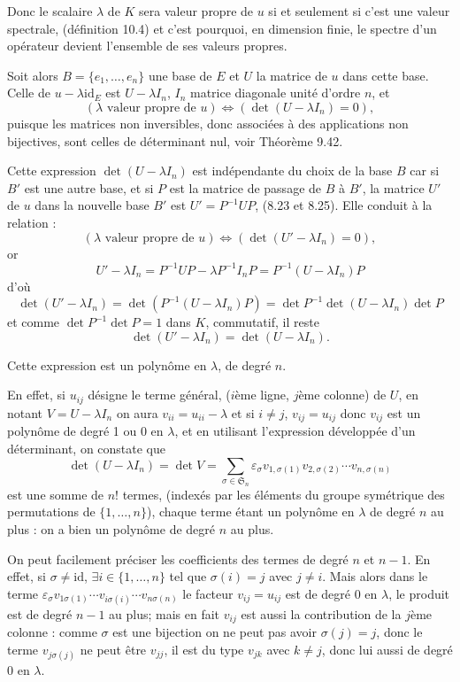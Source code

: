 Donc le scalaire $\lambda$ de $K$ sera valeur propre de $u$ si et seulement si c'est une valeur spectrale, (définition 10.4) et c'est pourquoi, en dimension finie, le spectre d'un opérateur devient l'ensemble de ses valeurs propres.

Soit alors $B=\{e_1,\ldots,e_n\}$ une base de $E$ et $U$ la matrice de $u$ dans cette base. Celle de $u-\lambda\mathrm{id}_E$ est $U-\lambda I_n$, $I_n$ matrice diagonale unité d'ordre $n$, et
\[
(\lambda\text{ valeur propre de }u)\Longleftrightarrow(\det(U-\lambda I_n)=0),
\]
puisque les matrices non inversibles, donc associées à des applications non bijectives, sont celles de déterminant nul, voir Théorème 9.42.

Cette expression $\det(U-\lambda I_n)$ est indépendante du choix de la base $B$ car si $B'$ est une autre base, et si $P$ est la matrice de passage de $B$ à $B'$, la matrice $U'$ de $u$ dans la nouvelle base $B'$ est $U'=P^{-1}UP$, (8.23 et 8.25). Elle conduit à la relation :
\[
(\lambda\text{ valeur propre de }u)\Longleftrightarrow(\det(U'-\lambda I_n)=0),
\]
or
\[
U'-\lambda I_n=P^{-1}UP-\lambda P^{-1}I_nP=P^{-1}(U-\lambda I_n)P
\]
d'où
\[
\det(U'-\lambda I_n)=\det(P^{-1}(U-\lambda I_n)P)=\det P^{-1}\det(U-\lambda I_n)\det P
\]
et comme $\det P^{-1}\det P=1$ dans $K$, commutatif, il reste
\[
\det(U'-\lambda I_n)=\det(U-\lambda I_n).
\]

Cette expression est un polynôme en $\lambda$, de degré $n$.

En effet, si $u_{ij}$ désigne le terme général, ($i$ème ligne, $j$ème colonne) de $U$, en notant $V=U-\lambda I_n$ on aura $v_{ii}=u_{ii}-\lambda$ et si $i\ne j$, $v_{ij}=u_{ij}$ donc $v_{ij}$ est un polynôme de degré 1 ou 0 en $\lambda$, et en utilisant l'expression développée d'un déterminant, on constate que
\[
\det(U-\lambda I_n)=\det V=\sum_{\sigma\in\mathfrak S_n}\varepsilon_\sigma
v_{1,\sigma(1)}v_{2,\sigma(2)}\cdots v_{n,\sigma(n)}
\]
est une somme de $n!$ termes, (indexés par les éléments du groupe symétrique des permutations de $\{1,\ldots,n\}$), chaque terme étant un polynôme en $\lambda$ de degré $n$ au plus : on a bien un polynôme de degré $n$ au plus.

On peut facilement préciser les coefficients des termes de degré $n$ et $n-1$. En effet, si $\sigma\ne\mathrm{id}$, $\exists i\in\{1,\ldots,n\}$ tel que $\sigma(i)=j$ avec $j\ne i$. Mais alors dans le terme $\varepsilon_\sigma v_{1\sigma(1)}\cdots v_{i\sigma(i)}\cdots v_{n\sigma(n)}$ le facteur $v_{ij}=u_{ij}$ est de degré 0 en $\lambda$, le produit est de degré $n-1$ au plus; mais en fait $v_{ij}$ est aussi la contribution de la $j$ème colonne : comme $\sigma$ est une bijection on ne peut pas avoir $\sigma(j)=j$, donc le terme $v_{j\sigma(j)}$ ne peut être $v_{jj}$, il est du type $v_{jk}$ avec $k\ne j$, donc lui aussi de degré 0 en $\lambda$.

